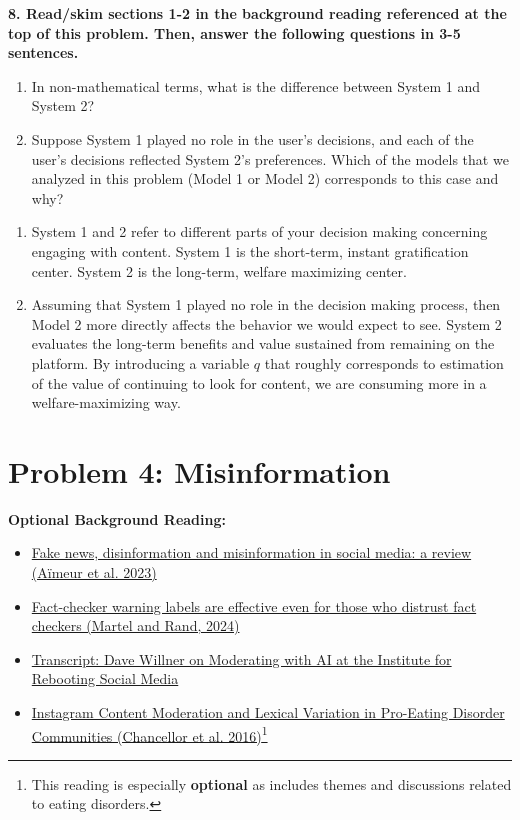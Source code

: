 \documentclass{article}
\begin{document}
\textbf{8. Read/skim sections 1-2 in the background reading referenced at the top of this problem. Then, answer the following questions in 3-5 sentences.}

\begin{enumerate}[label=\Alph*.]
    \item In non-mathematical terms, what is the difference between System 1 and System 2? 
    \item Suppose System 1 played no role in the user's decisions, and each of the user's decisions reflected System 2's preferences. Which of the models that we analyzed in this problem (Model 1 or Model 2) corresponds to this case and why? 
\end{enumerate}

\bigskip
\begin{mdframed}
\begin{enumerate}[label=\Alph*.]
    \item System 1 and 2 refer to different parts of your decision making concerning engaging with content. System 1 is the short-term, instant gratification center. System 2 is the long-term, welfare maximizing center. 
    \item Assuming that System 1 played no role in the decision making process, then Model 2 more directly affects the behavior we would expect to see. System 2 evaluates the long-term benefits and value sustained from remaining on the platform. By introducing a variable $q$ that roughly corresponds to estimation of the value of continuing to look for content, we are consuming more in a welfare-maximizing way.
\end{enumerate}
\end{mdframed}


\clearpage

\section*{Problem 4: Misinformation}

\textbf{Optional Background Reading:} 
\begin{itemize}
\item \href{https://link.springer.com/article/10.1007/s13278-023-01028-5}{Fake news, disinformation and misinformation in social media: a review (Aïmeur et al. 2023)}
\item \href{https://www.nature.com/articles/s41562-024-01973-x}{Fact-checker warning labels are effective even for those who distrust fact checkers (Martel and Rand, 2024)}
\item \href{https://www.techpolicy.press/transcript-dave-willner-on-moderating-with-ai-at-the-institute-for-rebooting-social-media/}{Transcript: Dave Willner on Moderating with AI at the Institute for Rebooting Social Media}
\item \href{https://researchrepository.parkviewhealth.org/cgi/viewcontent.cgi?article=1145&context=informatics}{Instagram Content Moderation and Lexical
Variation in Pro-Eating Disorder Communities (Chancellor et al. 2016)}\footnote{This reading is especially \textbf{optional} as includes themes and discussions related to eating disorders.}
\end{itemize}
\end{document}
